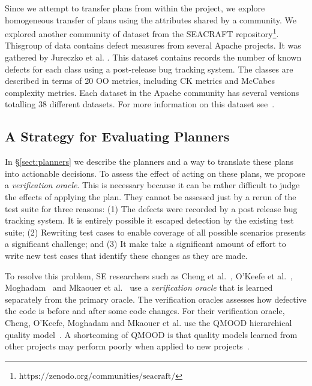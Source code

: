 \documentclass[10pt,journal,compsoc]{IEEEtran}
\newcommand{\tion}[1]{\S\ref{sect:#1}}
\begin{document}
Since we attempt to transfer plans from within the project, we explore homogeneous
transfer of plans using the attributes shared by a community. We explored another community of dataset from the SEACRAFT repository\footnote{$\text{https://zenodo.org/communities/seacraft/}$}. Thisgroup of data contains defect measures from several Apache projects. 
It was gathered by Jureczko et al. \cite{Jureczko2010}. This dataset 
contains records the number of known defects for each class using a 
post-release bug tracking system. The classes are described in terms of 20 
OO metrics, including CK metrics and McCabes complexity metrics. Each 
dataset in the Apache community has several versions totalling 38 
different datasets. For more information on this dataset
see~\cite{krishna16}. 

\subsection{A Strategy for Evaluating Planners}


% 

In \tion{planners} we describe the planners and a way to translate these plans into actionable decisions. To assess the effect of acting on these plans, we propose a  \textit{verification oracle}. This is necessary because it can be rather difficult  to judge the  effects of applying the plan. They cannot be assessed just by a rerun of the test suite for three reasons: (1) The defects were recorded by a post release bug tracking system. It is entirely possible it escaped detection by the existing test suite; (2) Rewriting test cases to enable coverage of all possible scenarios presents a significant challenge; and (3) It make take a significant amount of effort to write new test cases that identify these changes as they are made.

To resolve this problem, SE researchers such as
Cheng et al.~\cite{Cheng10}, O'Keefe et al.~\cite{OKeeffe08,OKeeffe07},
Moghadam~\cite{Moghadam2011} and Mkaouer et al.~\cite{Mkaouer14}
use a {\em verification oracle} that is learned separately from the primary oracle. The verification oracles assesses how defective the code is before and after some code changes. For their verification oracle, Cheng, O'Keefe, Moghadam and  Mkaouer et al. use the QMOOD hierarchical quality model~\cite{Bansiya02}.
A shortcoming of QMOOD is that quality models learned from other projects may perform poorly when applied to new projects~\cite{localvsglobal}.
\end{document}
